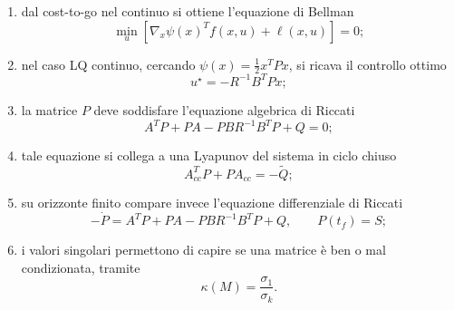 \begin{enumerate}
    \item dal cost-to-go nel continuo si ottiene l'equazione di Bellman
    \[
    \min_u\left[\nabla_x\psi(x)^Tf(x,u)+\ell(x,u)\right]=0;
    \]
    \item nel caso LQ continuo, cercando \(\psi(x)=\tfrac12 x^TPx\), si ricava il controllo ottimo
    \[
    u^\star=-R^{-1}B^TPx;
    \]
    \item la matrice \(P\) deve soddisfare l'equazione algebrica di Riccati
    \[
    A^TP+PA-PBR^{-1}B^TP+Q=0;
    \]
    \item tale equazione si collega a una Lyapunov del sistema in ciclo chiuso
    \[
    A_{cc}^TP+PA_{cc}=-\widetilde Q;
    \]
    \item su orizzonte finito compare invece l'equazione differenziale di Riccati
    \[
    -\dot P=A^TP+PA-PBR^{-1}B^TP+Q,
    \qquad
    P(t_f)=S;
    \]
    \item i valori singolari permettono di capire se una matrice è ben o mal condizionata, tramite
    \[
    \kappa(M)=\frac{\sigma_1}{\sigma_k}.
    \]
\end{enumerate}